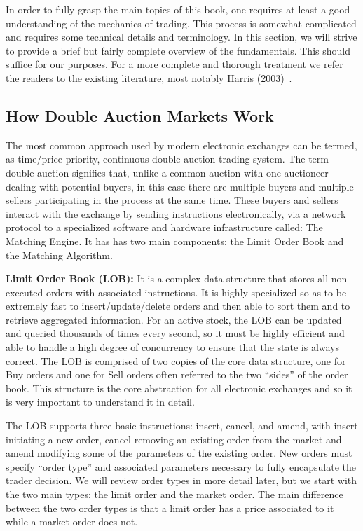 In order to fully grasp the main topics of this book, one requires at least a good understanding of the mechanics of trading. This process is somewhat complicated and requires some technical details and terminology. In this section, we will strive to provide a brief but fairly complete overview of the fundamentals. This should suffice for our purposes. For a more complete and thorough treatment we refer the readers to the existing literature, most notably Harris (2003)~\cite{harris03trade}.



\subsection{How Double Auction Markets Work\label{sec:how_double}} \label{in:double}

The most common approach used by modern electronic exchanges can be termed, as time/price priority, continuous double auction trading system. The term double auction signifies that, unlike a common auction with one auctioneer dealing with potential buyers, in this case there are multiple buyers and multiple sellers participating in the process at the same time. These buyers and sellers interact with the exchange by sending instructions electronically, via a network protocol to a specialized software and hardware infrastructure called: The Matching Engine. It has has two main components: the Limit Order Book and the Matching Algorithm. \twomedskip


\noindent\textbf{Limit Order Book (LOB):} It is a complex data structure that stores all non-executed orders with associated instructions. It is highly specialized so as to be extremely fast to insert/update/delete orders and then able to sort them and to retrieve aggregated information. For an active stock, the LOB can be updated and queried thousands of times every second, so it must be highly efficient and able to handle a high degree of concurrency to ensure that the state is always correct.  The LOB is comprised of two copies of the core data structure, one for Buy orders and one for Sell orders often referred to the two ``sides'' of the order book. This structure is the core abstraction for all electronic exchanges and so it is very important to understand it in detail. 


The LOB supports three basic instructions: insert, cancel, and amend, with insert initiating a new order, cancel removing an existing order from the market and amend modifying some of the parameters of the existing order. New orders must specify ``order type'' and associated parameters necessary to fully encapsulate the trader decision. We will review order types in more detail later, but we start with the two main types: the limit order and the market order. The main difference between the two order types is that a limit order has a price associated to it while a market order does not. 


